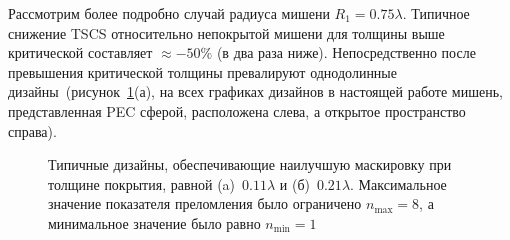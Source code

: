 Рассмотрим более подробно случай радиуса мишени ${R_1 =
  0.75\lambda}$. Типичное снижение TSCS относительно непокрытой мишени
для толщины выше критической составляет ${\approx -50\%}$ (в два раза
ниже). Непосредственно после превышения критической толщины
превалируют однодолинные
дизайны~(рисунок~\ref{img:designs}(а), на всех графиках
дизайнов в настоящей работе мишень, представленная PEC сферой,
расположена слева, а открытое пространство справа).
\begin{figure}
  \hfill
  \begin{minipage}[ht]{0.44\linewidth}
  \end{minipage}
  \hfill
  \begin{minipage}[ht]{0.44\linewidth}
  \end{minipage}
  \caption{Типичные дизайны, обеспечивающие наилучшую маскировку при
    толщине покрытия, равной (a)~$0.11\lambda$ и
    (б)~$0.21\lambda$. Максимальное значение показателя преломления
    было ограничено $n_{\mathrm{max}}=8$, а минимальное значение было
    равно $n_{\mathrm{min}}=1$ }
  \label{img:designs}  
\end{figure}
